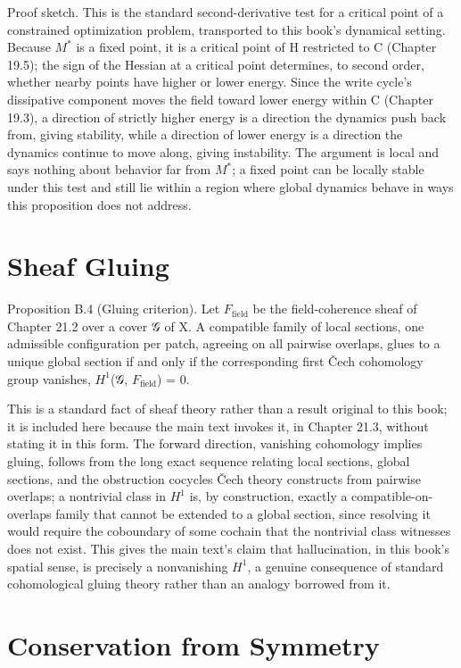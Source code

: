 Proof sketch. This is the standard second-derivative test for a critical point of a constrained optimization problem, transported to this book's dynamical setting. Because \(M^*\) is a fixed point, it is a critical point of H restricted to C (Chapter 19.5); the sign of the Hessian at a critical point determines, to second order, whether nearby points have higher or lower energy. Since the write cycle's dissipative component moves the field toward lower energy within C (Chapter 19.3), a direction of strictly higher energy is a direction the dynamics push back from, giving stability, while a direction of lower energy is a direction the dynamics continue to move along, giving instability. The argument is local and says nothing about behavior far from \(M^*\); a fixed point can be locally stable under this test and still lie within a region where global dynamics behave in ways this proposition does not address.

\section{Sheaf Gluing}

Proposition B.4 (Gluing criterion). Let \(F_{\mathrm{field}}\) be the field-coherence sheaf of Chapter 21.2 over a cover 𝒢 of X. A compatible family of local sections, one admissible configuration per patch, agreeing on all pairwise overlaps, glues to a unique global section if and only if the corresponding first Čech cohomology group vanishes, \(H^1\)(𝒢, \(F_{\mathrm{field}}\)) = 0.

This is a standard fact of sheaf theory rather than a result original to this book; it is included here because the main text invokes it, in Chapter 21.3, without stating it in this form. The forward direction, vanishing cohomology implies gluing, follows from the long exact sequence relating local sections, global sections, and the obstruction cocycles Čech theory constructs from pairwise overlaps; a nontrivial class in \(H^1\) is, by construction, exactly a compatible-on-overlaps family that cannot be extended to a global section, since resolving it would require the coboundary of some cochain that the nontrivial class witnesses does not exist. This gives the main text's claim that hallucination, in this book's spatial sense, is precisely a nonvanishing \(H^1\), a genuine consequence of standard cohomological gluing theory rather than an analogy borrowed from it.

\section{Conservation from Symmetry}

